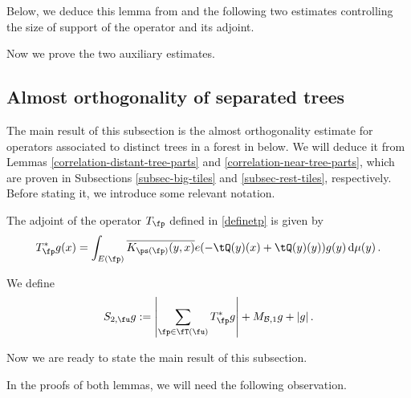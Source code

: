 Below, we deduce this lemma from  and the following two estimates controlling the size of support of the operator and its adjoint.





Now we prove the two auxiliary estimates.





\subsection{Almost orthogonality of separated trees}

The main result of this subsection is the almost orthogonality estimate for operators associated to distinct trees in a forest in  below. We will deduce it from Lemmas \ref{correlation-distant-tree-parts} and \ref{correlation-near-tree-parts}, which are proven in Subsections \ref{subsec-big-tiles} and \ref{subsec-rest-tiles}, respectively. Before stating it, we introduce some relevant notation.

The adjoint of the operator $T_{\fp}$ defined in \eqref{definetp} is given by
\begin{equation}
    \label{definetp*}
    T_{\fp}^* g(x) = \int_{E(\fp)} \overline{K_{\ps(\fp)}(y,x)} e(-\tQ(y)(x)+ \tQ(y)(y)) g(y) \, \mathrm{d}\mu(y)\,.
\end{equation}







We define
$$
    S_{2,\fu}g := \left|\sum_{\fp \in \fT(\fu)} T_{\fp}^*g \right| + M_{\mathcal{B},1}g + |g|\,.
$$




Now we are ready to state the main result of this subsection.





In the proofs of both lemmas, we will need the following observation.

